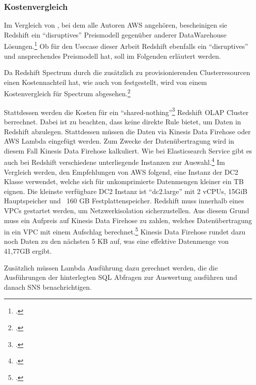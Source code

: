 \subsubsection{Kostenvergleich}
Im Vergleich von \citeauthor{Gupta.2015}, bei dem alle Autoren \ac{AWS} angehören, bescheinigen sie Redshift ein \enquote{disruptives} Preismodell gegenüber anderer DataWarehouse Lösungen.\footcite[Vgl.][]{Gupta.2015} Ob für den Usecase dieser Arbeit Redshift ebenfalls ein \enquote{disruptives} und ansprechendes Preismodell hat, soll im Folgenden erläutert werden.

Da Redshift Spectrum durch die zusätzlich zu provisionierenden Clusterresourcen einen Kostennachteil hat, wie auch von \citeauthor{Tan.2019} festgestellt, wird von einem Kostenvergleich für Spectrum abgesehen.\footcite[Vgl.][2178]{Tan.2019}

Stattdessen werden die Kosten für ein \enquote{shared-nothing}\footcite[Vgl.][2172]{Tan.2019} Redshift \ac{OLAP} Cluster berrechnet. Dabei ist zu beachten, dass \AWSIOT{} keine direkte Rule bietet, um Daten in Redshift abzulegen. Stattdessen müssen die Daten via Kinesis Data Firehose oder \ac{AWS} Lambda eingefügt werden. Zum Zwecke der Datenübertragung wird in diesem Fall Kinesis Data Firehose kalkuliert. Wie bei Elasticsearch Service gibt es auch bei Redshift verschiedene unterliegende Instanzen zur Auswahl.\footcite[Vgl. auch im Folgenden][]{AmazonWebServicesInc..o.J.z} Im Vergleich werden, den Empfehlungen von \ac{AWS} folgend, eine Instanz der \ac{DC2} Klasse verwendet, welche sich für unkomprimierte Datenmengen kleiner ein TB eignen. Die kleinste verfügbare \ac{DC2} Instanz ist \enquote{dc2.large} mit 2 vCPUs, 15GiB Hauptspeicher und ~160 GB Festplattenspeicher. Redshift muss innerhalb eines \acp{VPC} gestartet werden, um Netzwerkisolation sicherzustellen. Aus diesem Grund muss ein Aufpreis auf Kinesis Data Firehose zu zahlen, welches Datenübertragung in ein \ac{VPC} mit einem Aufschlag berechnet.\footcite[Vgl. auch im Folgenden][]{AmazonWebServicesInc..o.J.y} Kinesis Data Firehose rundet dazu noch Daten zu den nächsten 5 KB auf, was eine effektive Datenmenge von 41,77GB ergibt.

Zusätzlich müssen Lambda Ausführung dazu gerechnet werden, die die Ausführungen der hinterlegten \ac{SQL} Abfragen zur Auswertung ausführen und danach \ac{SNS} benachrichtigen.

